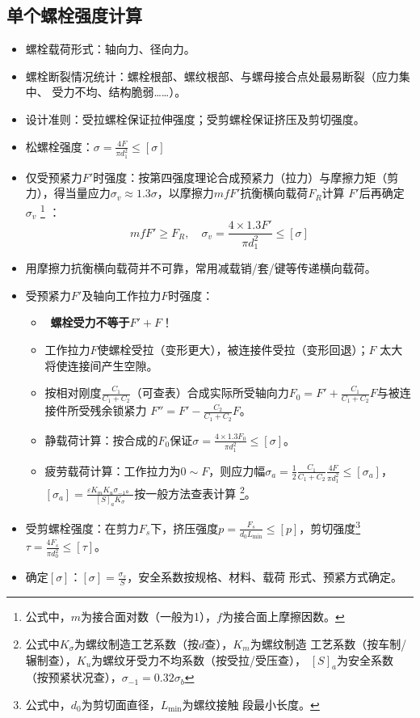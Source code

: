 \documentclass[12pt,a4paper]{article}
\newcommand{\tightlist}{\setlength{\parskip}{0pt}\setlength{\itemsep}{0pt}}
\newcommand{\hint}[1]{\textsf{（#1）}}
\newcommand{\minor}[1]{{\color{gray} #1}}
\renewcommand{\emph}[1]{\faIcon[regular]{lightbulb}\ \textbf{#1}}
\begin{document}
\subsection{单个螺栓强度计算}
\begin{itemize}\tightlist
    \item 螺栓载荷形式：轴向力、径向力。
    \item 螺栓断裂情况统计：螺栓根部、螺纹根部、与螺母接合点处最易断裂\hint{应力集中、
    受力不均、结构脆弱……}。
    \item 设计准则：受拉螺栓保证拉伸强度；受剪螺栓保证挤压及剪切强度。
    \item 松螺栓强度：$\sigma=\frac{4F}{\pi d_1^2}\leq[\sigma]$
    \item 仅受预紧力$F'$时强度：按第四强度理论合成预紧力\hint{拉力}与摩擦力矩\hint{剪
    力}，得当量应力$\sigma_v\approx1.3\sigma$，以摩擦力$mfF'$抗衡横向载荷$F_R$计算
    $F'$后再确定$\sigma_v$
    \footnote{公式中，$m$为接合面对数（一般为1），$f$为接合面上摩擦因数。}
    ：
    \begin{equation}
    mfF'\geq F_R,\quad\sigma_v=\frac{4\times1.3F'}{\pi d_1^2}\leq[\sigma]
    \end{equation}
    \item \minor{用摩擦力抗衡横向载荷并不可靠，常用减载销/套/键等传递横向载荷。}
    \item 受预紧力$F'$及轴向工作拉力$F$时强度：
    \begin{itemize}\tightlist
        \item \emph{螺栓受力不等于$F'+F$}！
        \item 工作拉力$F$使螺栓受拉\hint{变形更大}，被连接件受拉\hint{变形回退}；$F$
        太大将使连接间产生空隙。
        \item 按相对刚度$\frac{C_1}{C_1+C_2}$\hint{可查表}合成实际所受轴向力$F_0=
        F'+\frac{C_1}{C_1+C_2}F$与被连接件所受残余锁紧力
        $F''=F'-\frac{C_2}{C_1+C_2}F$。
        \item 静载荷计算：按合成的$F_0$保证$\sigma=\frac{4\times1.3F_0}{\pi d_1^2}
        \leq[\sigma]$。
        \item 疲劳载荷计算：工作拉力为$0\sim F$，则应力幅$\sigma_a=\frac12
        \frac{C_1}{C_1+C_2}\frac{4F}{\pi d_1^2}\leq[\sigma_a]$，$[\sigma_a]=
        \frac{\varepsilon K_mK_u\sigma_{-1}。}{[S]_aK_\sigma}$按一般方法查表计算
        \footnote{公式中$K_\sigma$为螺纹制造工艺系数\hint{按$d$查}，$K_m$为螺纹制造
        工艺系数\hint{按车制/辗制查}，$K_u$为螺纹牙受力不均系数\hint{按受拉/受压查}，
        $[S]_a$为安全系数\hint{按预紧状况查}，$\sigma_{-1}=0.32\sigma_b$}。
    \end{itemize}
    \item 受剪螺栓强度：在剪力$F_s$下，挤压强度$p=\frac{F_s}{d_0L_{\text{min}}}
    \leq[p]$，剪切强度\footnote{公式中，$d_0$为剪切面直径，$L_\text{min}$为螺纹接触
    段最小长度。}$\tau=\frac{4F_s}{\pi d_0^2}\leq[\tau]$。
    \item 确定$[\sigma]$：$[\sigma]=\frac{\sigma_s}{S}$，安全系数按规格、材料、载荷
    形式、预紧方式确定。
\end{itemize}
\end{document}
